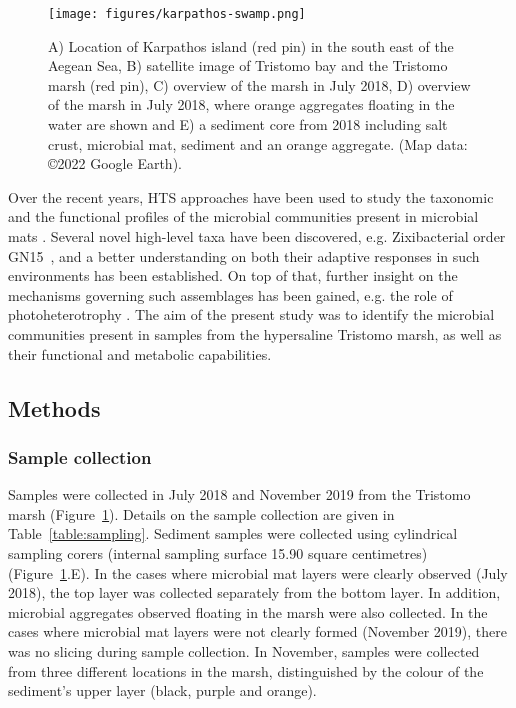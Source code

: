    \begin{figure}[!htbp]
      \centering
      \texttt{[image: figures/karpathos-swamp.png]}
      \caption[Tristomo marsh in Karpathos overview]{
         A) Location of Karpathos island (red pin) in the south east of the Aegean Sea, 
         B) satellite image of Tristomo bay and the Tristomo marsh (red pin), 
         C) overview of the marsh in July 2018, 
         D) overview of the marsh in July 2018, where orange aggregates floating in the water are shown and 
         E) a sediment core from 2018 including salt crust, microbial mat, sediment and an orange aggregate. 
         (Map data: ©2022 Google Earth).
      }
      \label{fig:karpathos-marsh}
   \end{figure}   



   Over the recent years, HTS approaches have been used to study the taxonomic and the functional 
   profiles of the microbial communities present in microbial mats 
   \citep{chen_discovery_2020, wong_microbial_2020, kindler_genome-resolved_2022}. 
   Several novel high-level taxa have been discovered, e.g. Zixibacterial order GN15~\citep{wong_microbial_2020}, 
   and a better understanding on both their adaptive responses in such environments has been established. 
   On top of that, further insight on the mechanisms governing such assemblages has been gained, e.g. the role of photoheterotrophy 
   \citep{kindler_genome-resolved_2022}. 
   The aim of the present study was to identify the microbial communities present in samples from the 
   hypersaline Tristomo marsh, as well as their functional and metabolic capabilities.


\subsection{Methods}
\label{swamp:methods}

\subsubsection*{Sample collection}

   Samples were collected in July 2018 and November 2019 from the Tristomo marsh (Figure~\ref{fig:karpathos-marsh}). 
   Details on the sample collection are given in Table~\ref{table:sampling}. 
   Sediment samples were collected using cylindrical sampling corers (internal sampling surface 15.90 square centimetres) (Figure~\ref{fig:karpathos-marsh}.E). 
   In the cases where microbial mat layers were clearly observed (July 2018), the top layer was collected separately from the bottom layer. 
   In addition, microbial aggregates observed floating in the marsh were also collected. 
   In the cases where microbial mat layers were not clearly formed (November 2019), there was no slicing during sample collection. 
   In November, samples were collected from three different locations in the marsh, distinguished by the colour of the sediment’s upper layer (black, purple and orange). 

